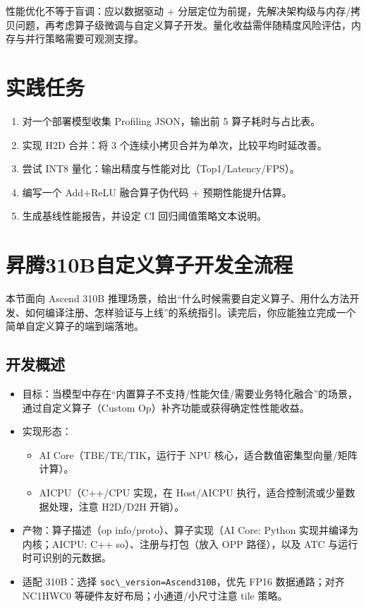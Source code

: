 性能优化不等于盲调：应以数据驱动 +
分层定位为前提，先解决架构级与内存/拷贝问题，再考虑算子级微调与自定义算子开发。量化收益需伴随精度风险评估，内存与并行策略需要可观测支撑。

\section{实践任务}\label{ux5b9eux8df5ux4efbux52a1}

\begin{enumerate}
\def\labelenumi{\arabic{enumi}.}
\tightlist
\item
  对一个部署模型收集 Profiling JSON，输出前 5 算子耗时与占比表。
\item
  实现 H2D 合并：将 3 个连续小拷贝合并为单次，比较平均时延改善。
\item
  尝试 INT8 量化：输出精度与性能对比（Top1/Latency/FPS）。
\item
  编写一个 Add+ReLU 融合算子伪代码 + 预期性能提升估算。
\item
  生成基线性能报告，并设定 CI 回归阈值策略文本说明。
\end{enumerate}

\section{昇腾310B自定义算子开发全流程}\label{ux6607ux817e310bux81eaux5b9aux4e49ux7b97ux5b50ux5f00ux53d1ux5168ux6d41ux7a0b}

本节面向 Ascend 310B
推理场景，给出``什么时候需要自定义算子、用什么方法开发、如何编译注册、怎样验证与上线''的系统指引。读完后，你应能独立完成一个简单自定义算子的端到端落地。

\subsection{开发概述}\label{ux5f00ux53d1ux6982ux8ff0}

\begin{itemize}
\tightlist
\item
  目标：当模型中存在``内置算子不支持/性能欠佳/需要业务特化融合''的场景，通过自定义算子（Custom
  Op）补齐功能或获得确定性性能收益。
\item
  实现形态：

  \begin{itemize}
  \tightlist
  \item
    AI Core（TBE/TE/TIK，运行于 NPU
    核心，适合数值密集型向量/矩阵计算）。
  \item
    AICPU（C++/CPU 实现，在 Host/AICPU
    执行，适合控制流或少量数据处理，注意 H2D/D2H 开销）。
  \end{itemize}
\item
  产物：算子描述（op info/proto）、算子实现（AI Core: Python
  实现并编译为内核；AICPU: C++ so）、注册与打包（放入 OPP 路径），以及
  ATC 与运行时可识别的元数据。
\item
  适配 310B：选择
  \passthrough{\lstinline!soc\_version=Ascend310B!}，优先 FP16
  数据通路；对齐 NC1HWC0 等硬件友好布局；小通道/小尺寸注意 tile 策略。
\end{itemize}

